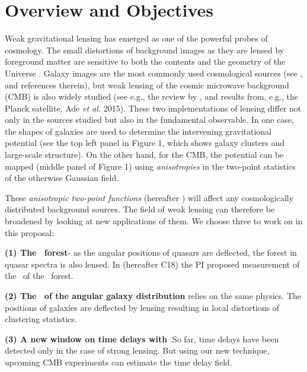 \section{Overview and Objectives}
Weak gravitational lensing has emerged as one of the powerful probes
of cosmology. The small distortions of background images as
they are lensed by foreground matter are sensitive to both the
contents and the geometry of the Universe \citep[e.g.,][]{blandford92,
hoekstra2008}.  Galaxy images are the most commonly used
cosmological sources (see \citealt{Kilbinger2015}, and references
therein), but weak lensing of the cosmic microwave background (CMB) is
also widely studied (see e.g., the review by \citealt{lewis2006}, and
results from, e.g., the Planck satellite, Ade {\it et al.} 2015).
 These two implementations of lensing differ not only 
in the sources 
studied  but also in
the fundamental observable. In one case,
 the shapes of galaxies are used to
determine the intervening gravitational potential (see the top
left panel in Figure 1, which shows galaxy clusters and large-scale structure).
On the other hand, for the
CMB, the potential can be mapped (middle panel of Figure 1) using
{\it anisotropies} in the
two-point statistics of the otherwise Gaussian field. 


These {\it anisotropic two-point functions} (hereafter \atf) will 
affect any cosmologically distributed background
sources. The field of weak lensing can therefore be broadened by looking 
at new applications of them. We choose three to work  on in this proposal:

{\bf(1) The \lya\ forest}- as the angular 
positions of quasars are deflected, the forest 
in quasar spectra is also lensed.
In \cite{croft17} (hereafter C18)
 the PI proposed measurement of the 
\atf\ of the \lya\ forest.


 {\bf (2) The \atf\ 
of the angular galaxy distribution}
relies on the same physics. The positions
of galaxies are deflected by lensing
resulting in local distortions of
clustering statistics.

{\bf (3) A new window on time delays with \atf}.So far, time delays have been
detected only in the case of strong lensing. But using our new
technique,  upcoming CMB experiments can estimate the time
delay field.



\vspace{-0.1cm}


